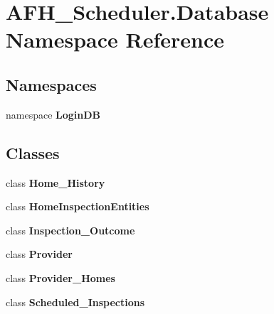 \section{A\+F\+H\+\_\+\+Scheduler.\+Database Namespace Reference}
\label{namespace_a_f_h___scheduler_1_1_database}
\subsection*{Namespaces}
\begin{DoxyCompactItemize}
\item 
namespace \textbf{ Login\+DB}
\end{DoxyCompactItemize}
\subsection*{Classes}
\begin{DoxyCompactItemize}
\item 
class \textbf{ Home\+\_\+\+History}
\item 
class \textbf{ Home\+Inspection\+Entities}
\item 
class \textbf{ Inspection\+\_\+\+Outcome}
\item 
class \textbf{ Provider}
\item 
class \textbf{ Provider\+\_\+\+Homes}
\item 
class \textbf{ Scheduled\+\_\+\+Inspections}
\end{DoxyCompactItemize}
